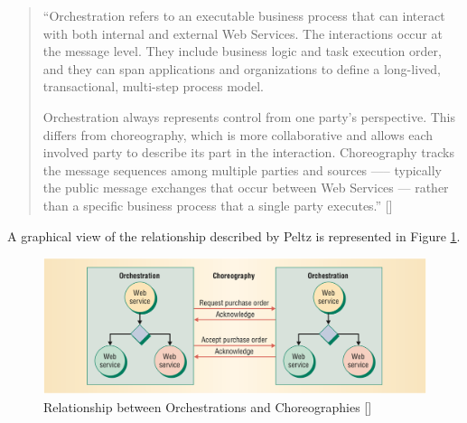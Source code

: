 \begin{quotation}
	``Orchestration refers to an executable business process that can interact with both internal and external Web Services. The interactions occur at the message level. They include business logic and task execution order, and they can span applications and organizations to define a long-lived, transactional, multi-step process model.

	Orchestration always represents control from one party’s perspective. This differs from choreography, which is more collaborative and allows each involved party to describe its part in the interaction. Choreography tracks the message sequences among multiple parties and sources —-- typically the public message exchanges that occur between Web Services --- rather than a specific business process that a single party executes.'' [\citet{WSOC}]
\end{quotation}

A graphical view of the relationship described by Peltz is represented in Figure \ref{relation-orchestrationXchoreography}.

\begin{figure}[htb]
	\centering
	\includegraphics[width=\textwidth]{images/relation-orchestrationXchoreography}
	\caption{Relationship between Orchestrations and Choreographies [\citet{WSOC}]}
	\label{relation-orchestrationXchoreography}
\end{figure}





